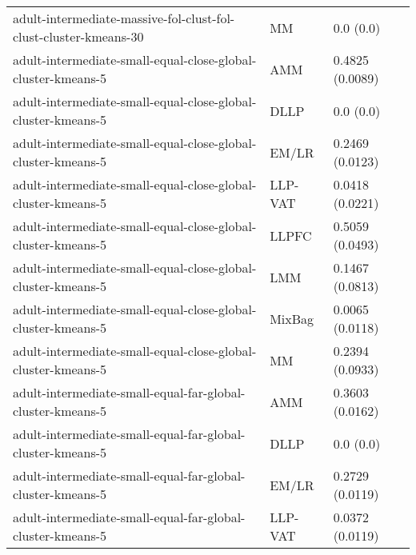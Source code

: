 \begin{longtable}{lll}
                                             adult-intermediate-massive-fol-clust-fol-clust-cluster-kmeans-30 &        MM &                                 0.0 (0.0) \\
                                                 adult-intermediate-small-equal-close-global-cluster-kmeans-5 &       AMM &                           0.4825 (0.0089) \\
                                                 adult-intermediate-small-equal-close-global-cluster-kmeans-5 &      DLLP &                                 0.0 (0.0) \\
                                                 adult-intermediate-small-equal-close-global-cluster-kmeans-5 &     EM/LR &                           0.2469 (0.0123) \\
                                                 adult-intermediate-small-equal-close-global-cluster-kmeans-5 &   LLP-VAT &                           0.0418 (0.0221) \\
                                                 adult-intermediate-small-equal-close-global-cluster-kmeans-5 &     LLPFC &                           0.5059 (0.0493) \\
                                                 adult-intermediate-small-equal-close-global-cluster-kmeans-5 &       LMM &                           0.1467 (0.0813) \\
                                                 adult-intermediate-small-equal-close-global-cluster-kmeans-5 &    MixBag &                           0.0065 (0.0118) \\
                                                 adult-intermediate-small-equal-close-global-cluster-kmeans-5 &        MM &                           0.2394 (0.0933) \\
                                                   adult-intermediate-small-equal-far-global-cluster-kmeans-5 &       AMM &                           0.3603 (0.0162) \\
                                                   adult-intermediate-small-equal-far-global-cluster-kmeans-5 &      DLLP &                                 0.0 (0.0) \\
                                                   adult-intermediate-small-equal-far-global-cluster-kmeans-5 &     EM/LR &                           0.2729 (0.0119) \\
                                                   adult-intermediate-small-equal-far-global-cluster-kmeans-5 &   LLP-VAT &                           0.0372 (0.0119) \\

\end{longtable}
